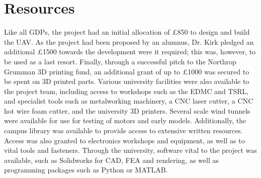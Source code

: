 \documentclass[../../main.tex]{subfiles}
\begin{document}
\section{Resources} \label{sec:introduction:resources}

Like all GDPs, the project had an initial allocation of £850 to design and build the UAV.
As the project had been proposed by an alumnus, Dr. Kirk pledged an additional £1500 towards the development were it required; this was, however, to be used as a last resort.
Finally, through a successful pitch to the Northrop Grumman 3D printing fund, an additional grant of up to £1000 was secured to be spent on 3D printed parts. 
Various university facilities were also available to the project team, including access to workshops such as the EDMC and TSRL, and specialist tools such as metalworking machinery, a CNC laser cutter, a CNC hot wire foam cutter, and the university 3D printers. Several scale wind tunnels were available for use for testing of motors and early models. Additionally, the campus library was available to provide access to extensive written resources. Access was also granted to electronics workshops and equipment, as well as to vital tools and fasteners.
Through the university, software vital to the project was available, such as Solidworks for CAD, FEA and rendering, as well as programming packages such as Python or MATLAB.
\end{document}
